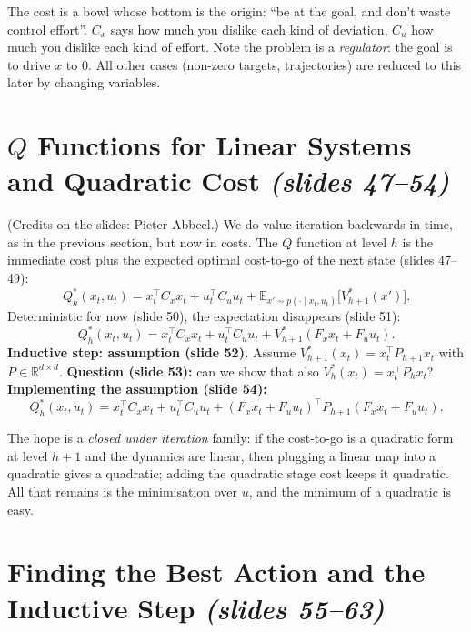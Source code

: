 \documentclass[11pt,a4paper]{article}
\newcommand{\E}{\mathbb{E}}
\newcommand{\R}{\mathbb{R}}
\newcommand{\slides}[1]{\emph{(slides #1)}}
\theoremstyle{plain}
\theoremstyle{definition}
\theoremstyle{remark}
\begin{document}
\begin{intuition}
The cost is a bowl whose bottom is the origin: ``be at the goal, and don't waste control effort''. $C_x$ says how much you dislike each kind of deviation, $C_u$ how much you dislike each kind of effort. Note the problem is a \emph{regulator}: the goal is to drive $x$ to $0$. All other cases (non-zero targets, trajectories) are reduced to this later by changing variables.
\end{intuition}

\section{$Q$ Functions for Linear Systems and Quadratic Cost \slides{47--54}}

(Credits on the slides: Pieter Abbeel.) We do value iteration backwards in time, as in the previous section, but now in costs. The $Q$ function at level $h$ is the immediate cost plus the expected optimal cost-to-go of the next state (slides 47--49):
\[
Q^*_h(x_t,u_t)=x_t^\top C_xx_t+u_t^\top C_uu_t+\E_{x'\sim p(\cdot\mid x_t,u_t)}\big[V^*_{h+1}(x')\big].
\]
Deterministic for now (slide 50), the expectation disappears (slide 51):
\[
Q^*_h(x_t,u_t)=x_t^\top C_xx_t+u_t^\top C_uu_t+V^*_{h+1}(F_xx_t+F_uu_t).
\]
\textbf{Inductive step: assumption (slide 52).} Assume $V^*_{h+1}(x_t)=x_t^\top P_{h+1}x_t$ with $P\in\R^{d\times d}$. \textbf{Question (slide 53):} can we show that also $V^*_h(x_t)=x_t^\top P_hx_t$? \textbf{Implementing the assumption (slide 54):}
\[
Q^*_h(x_t,u_t)=x_t^\top C_xx_t+u_t^\top C_uu_t+(F_xx_t+F_uu_t)^\top P_{h+1}(F_xx_t+F_uu_t).
\]

\begin{intuition}
The hope is a \emph{closed under iteration} family: if the cost-to-go is a quadratic form at level $h+1$ and the dynamics are linear, then plugging a linear map into a quadratic gives a quadratic; adding the quadratic stage cost keeps it quadratic. All that remains is the minimisation over $u$, and the minimum of a quadratic is easy.
\end{intuition}

\section{Finding the Best Action and the Inductive Step \slides{55--63}}
\end{document}
